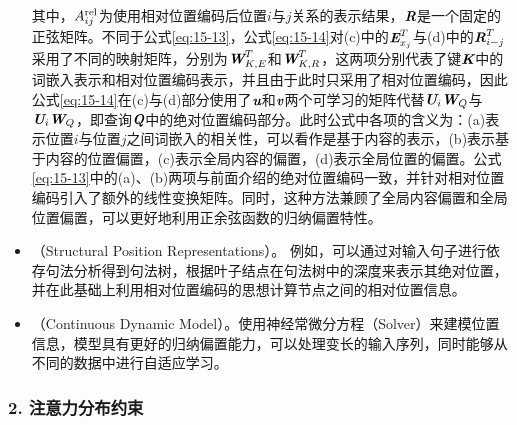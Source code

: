 \begin{itemize}
\noindent 其中，$A_{ij}^{\rm rel}$为使用相对位置编码后位置$i$与$j$关系的表示结果，$\textbf{\em R}$是一个固定的正弦矩阵。不同于公式\eqref{eq:15-13}，公式\eqref{eq:15-14}对(c)中的$\textbf{\em E}_{x_j}^{T}$与(d)中的$\textbf{\em R}_{i-j}^{T}$采用了不同的映射矩阵，分别为$\textbf{\em W}_{K,E}^{T}$和$\textbf{\em W}_{K,R}^{T}$，这两项分别代表了键$\textbf{\em K}$中的词嵌入表示和相对位置编码表示，并且由于此时只采用了相对位置编码，因此公式\eqref{eq:15-14}在(c)与(d)部分使用了$\textbf{\em u}$和$\textbf{\em v}$两个可学习的矩阵代替$\textbf{\em U}_i\textbf{\em W}_Q$与$\textbf{\em U}_i\textbf{\em W}_Q$，即查询$\textbf{\em Q}$中的绝对位置编码部分。此时公式中各项的含义为：(a)表示位置$i$与位置$j$之间词嵌入的相关性，可以看作是基于内容的表示，(b)表示基于内容的位置偏置，(c)表示全局内容的偏置，(d)表示全局位置的偏置。公式\eqref{eq:15-13}中的(a)、(b)两项与前面介绍的绝对位置编码一致，并针对相对位置编码引入了额外的线性变换矩阵。同时，这种方法兼顾了全局内容偏置和全局位置偏置，可以更好地利用正余弦函数的归纳偏置特性。

\vspace{0.5em}
\item {\small{}}（Structural Position Representations）。 例如，可以通过对输入句子进行依存句法分析得到句法树，根据叶子结点在句法树中的深度来表示其绝对位置，并在此基础上利用相对位置编码的思想计算节点之间的相对位置信息。

\vspace{0.5em}
\item {\small{}}（Continuous Dynamic Model）。使用神经常微分方程{\small{}}（Solver）来建模位置信息，模型具有更好的归纳偏置能力，可以处理变长的输入序列，同时能够从不同的数据中进行自适应学习。
\vspace{0.5em}
\end{itemize}


\subsubsection{2. 注意力分布约束}

